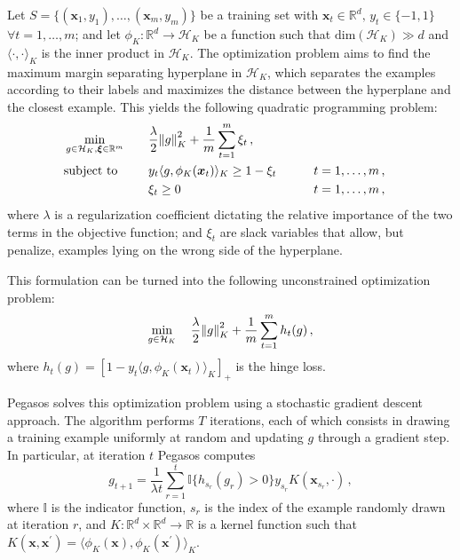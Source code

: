 \documentclass[runningheads]{llncs}
\begin{document}
Let $S = \{(\bm{x}_1,y_1),\dots,(\bm{x}_m,y_m)\}$ be a training set with $\bm{x}_t \in \mathbb{R}^d, \, y_t \in \{-1, 1\}$ $\forall t=1,\dots,m$; and let $\phi_K : \mathbb{R}^d \to \mathcal{H}_K$ be a function such that $\text{dim}(\mathcal{H}_K) \gg d$ and $\langle \cdot , \cdot \rangle_K$ is the inner product in $\mathcal{H}_K$. The optimization problem aims to find the maximum margin separating hyperplane in $\mathcal{H}_K$, which separates the examples according to their labels and maximizes the distance between the hyperplane and the closest example. This yields the following quadratic programming problem: 
\begin{alignat}{3}
  &\min_{g \in \mathcal{H}_K, \bm{\xi} \in \mathbb{R}^m} & \quad & \frac{\lambda}{2} \norm{g}_K^2 + \frac{1}{m}\sum_{t=1}^{m} \xi_t \, , \notag\\
  &\text{subject to}  &       & y_t \langle g, \phi_K(\bm{x}_t) \rangle_K \geq 1 - \xi_t &\qquad& t = 1,\dots,m \, , \notag\\
  &                   &       & \xi_t \geq 0  &\qquad& t = 1,\dots,m \, , \notag
\end{alignat}
where $\lambda$ is a regularization coefficient dictating the relative importance of the two terms in the objective function; and $\xi_t$ are slack variables that allow, but penalize, examples lying on the wrong side of the hyperplane.

This formulation can be turned into the following unconstrained optimization problem:
\[
  \min_{g \in \mathcal{H}_K} \quad \frac{\lambda}{2} \norm{g}_K^2 + \frac{1}{m}\sum_{t=1}^{m} h_t(g) \, ,
\]
where $h_t(g) = [1 - y_t\langle g, \phi_K(\bm{x}_t) \rangle_K]_+$ is the hinge loss.

Pegasos solves this optimization problem using a stochastic gradient descent approach. The algorithm performs $T$ iterations, each of which consists in drawing a training example uniformly at random and updating $g$ through a gradient step. In particular, at iteration $t$ Pegasos computes
\begin{equation}
  g_{t+1} = \frac{1}{\lambda t} \sum_{r = 1}^{t} \mathbb{I}\{h_{s_r}(g_r) > 0\} y_{s_r} K(\bm{x}_{s_r}, \cdot) \, , \label{eqn:pegasos:g}
\end{equation}
where $\mathbb{I}$ is the indicator function, $s_r$ is the index of the example randomly drawn at iteration $r$, and $K : \mathbb{R}^d \times \mathbb{R}^d \to \mathbb{R}$ is a kernel function such that $K(\bm{x},\bm{x}^\prime) = \langle \phi_K(\bm{x}), \phi_K(\bm{x}^\prime) \rangle_K$.
\end{document}
